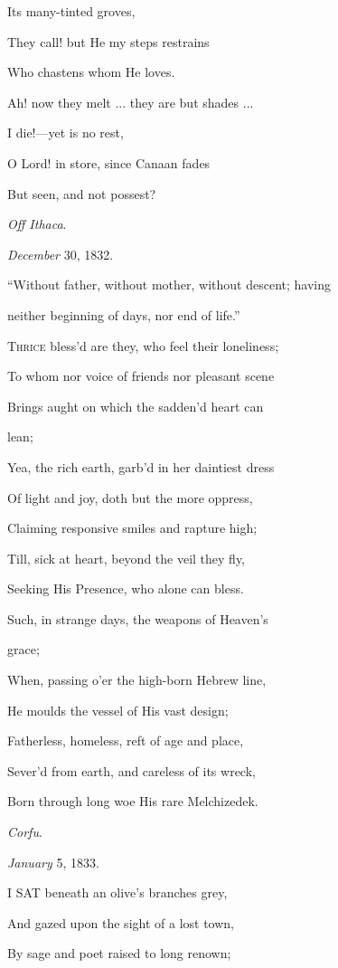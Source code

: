 Its many-tinted groves,

They call! but He my steps restrains

Who chastens whom He loves.

Ah! now they melt ... they are but shades ...

I die!—yet is no rest,

O Lord! in store, since Canaan fades

But seen, and not possest?

\emph{Off Ithaca}.

\emph{December} 30, 1832.


``Without father, without mother, without
descent; having

neither beginning of days, nor end of life.''

T\textsc{hrice} bless'd are they, who feel their loneliness;

To whom nor voice of friends nor pleasant
scene

Brings aught on which the sadden'd heart
can

lean;

Yea, the rich earth, garb'd in her daintiest dress

Of light and joy, doth but the more oppress,

Claiming responsive smiles and rapture
high;

Till, sick at heart, beyond the veil they
fly,

Seeking His Presence, who alone can bless.

Such, in strange days, the weapons of Heaven's

grace;

When, passing o'er the high-born Hebrew line,

He moulds the vessel of His vast design;

Fatherless, homeless, reft of age and place,

Sever'd from earth, and careless of its wreck,

Born through long woe His rare Melchizedek.

\emph{Corfu}.

\emph{January} 5, 1833.


I SAT beneath an olive's branches grey,

And gazed upon the sight of a lost town,

By sage and poet raised to long renown;

